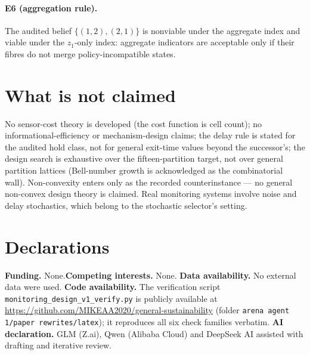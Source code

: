\documentclass[10pt,twocolumn]{article}
\theoremstyle{definition}
\begin{document}
\paragraph{E6 (aggregation rule).} The audited belief
$\{(1,2),(2,1)\}$ is nonviable under the aggregate index and viable under
the $z_1$-only index: aggregate indicators are acceptable only if their
fibres do not merge policy-incompatible states.

\section{What is not claimed}

No sensor-cost theory is developed (the cost function is cell count); no
informational-efficiency or mechanism-design claims; the delay rule is
stated for the audited hold class, not for general exit-time values
beyond the successor's; the design search is exhaustive over the
fifteen-partition target, not over general partition lattices (Bell-number
growth is acknowledged as the combinatorial wall). Non-convexity enters
only as the recorded counterinstance --- no general non-convex design
theory is claimed. Real monitoring systems involve noise and delay
stochastics, which belong to the stochastic selector's setting.


\section*{Declarations}
\textbf{Funding.} None.\quad \textbf{Competing interests.} None.\quad
\textbf{Data availability.} No external data were used.\quad
\textbf{Code availability.} The verification script
\texttt{monitoring\_design\_v1\_verify.py} is publicly available at
\url{https://github.com/MIKEAA2020/general-sustainability} (folder
\texttt{arena agent 1/paper rewrites/latex}); it reproduces all six check
families verbatim.\quad
\textbf{AI declaration.} GLM (Z.ai), Qwen (Alibaba Cloud) and DeepSeek AI
assisted with drafting and iterative review.
\end{document}
